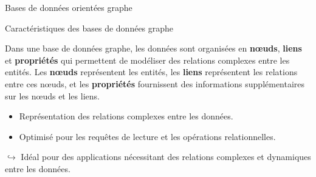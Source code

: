 \begin{frame}[standout]

    Bases de données orientées graphe


\end{frame}

\begin{frame}{Caractéristiques des bases de données graphe}

    \begin{definitionbox}
        Dans une base de données graphe, les données sont organisées en
        \textbf{nœuds}, \textbf{liens} et \textbf{propriétés} qui permettent de
        modéliser des relations complexes entre les entités. Les \textbf{nœuds}
        représentent les entités, les \textbf{liens} représentent les relations
        entre ces nœuds, et les \textbf{propriétés} fournissent des informations
        supplémentaires sur les nœuds et les liens.
    \end{definitionbox}

    \begin{noteblock}
        \begin{itemize}
            \item Représentation des relations complexes entre les données.
            \item Optimisé pour les requêtes de lecture et les opérations
                  relationnelles.
        \end{itemize}
        $\hookrightarrow$ Idéal pour des applications nécessitant des relations
        complexes et dynamiques entre les données.
    \end{noteblock}

\end{frame}

